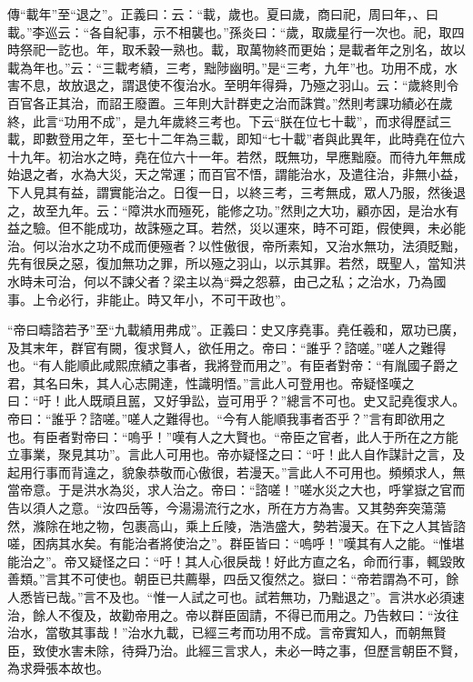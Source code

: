 {\noindent\zhuan{}\fzbyks 傳“載年”至“退之”。正義曰：云：“載，歲也。夏曰歲，商曰祀，周曰年，、曰載。”李巡云：“各自紀事，示不相襲也。”孫炎曰：“歲，取歲星行一次也。祀，取四時祭祀一訖也。年，取禾穀一熟也。載，取萬物終而更始；是載者年之別名，故以載為年也。”云：“三載考績，三考，黜陟幽明。”是“三考，九年”也。功用不成，水害不息，故放退之，謂退使不復治水。至明年得舜，乃殛之羽山。云：“歲終則令百官各正其治，而詔王廢置。三年則大計群吏之治而誅賞。”然則考課功績必在歲終，此言“功用不成”，是九年歲終三考也。下云“朕在位七十載”，而求得歷試三載，即數登用之年，至七十二年為三載，即知“七十載”者與此異年，此時堯在位六十九年。初治水之時，堯在位六十一年。若然，既無功，早應黜廢。而待九年無成始退之者，水為大災，天之常運；而百官不悟，謂能治水，及遣往治，非無小益，下人見其有益，謂實能治之。日復一日，以終三考，三考無成，眾人乃服，然後退之，故至九年。云：“障洪水而殛死，能修之功。”然則之大功，顧亦因，是治水有益之驗。但不能成功，故誅殛之耳。若然，災以運來，時不可距，假使興，未必能治。何以治水之功不成而便殛者？以性傲很，帝所素知，又治水無功，法須貶黜，先有很戾之惡，復加無功之罪，所以殛之羽山，以示其罪。若然，既聖人，當知洪水時未可治，何以不諫父者？梁主以為“舜之怨慕，由己之私；之治水，乃為國事。上令必行，非能止。時又年小，不可干政也”。 \par}

{\noindent\shu{}\fzkt “帝曰疇諮若予”至“九載績用弗成”。正義曰：史又序堯事。堯任羲和，眾功已廣，及其末年，群官有闕，復求賢人，欲任用之。帝曰：“誰乎？諮嗟。”嗟人之難得也。“有人能順此咸熙庶績之事者，我將登而用之”。有臣者對帝：“有胤國子爵之君，其名曰朱，其人心志開達，性識明悟。”言此人可登用也。帝疑怪嘆之曰：“吁！此人既頑且嚚，又好爭訟，豈可用乎？”總言不可也。史又記堯復求人。帝曰：“誰乎？諮嗟。”嗟人之難得也。“今有人能順我事者否乎？”言有即欲用之也。有臣者對帝曰：“嗚乎！”嘆有人之大賢也。“帝臣之官者，此人于所在之方能立事業，聚見其功”。言此人可用也。帝亦疑怪之曰：“吁！此人自作謀計之言，及起用行事而背違之，貌象恭敬而心傲很，若漫天。”言此人不可用也。頻頻求人，無當帝意。于是洪水為災，求人治之。帝曰：“諮嗟！”嗟水災之大也，呼掌嶽之官而告以須人之意。“汝四岳等，今湯湯流行之水，所在方方為害。又其勢奔突蕩蕩然，滌除在地之物，包裹高山，乘上丘陵，浩浩盛大，勢若漫天。在下之人其皆諮嗟，困病其水矣。有能治者將使治之”。群臣皆曰：“嗚呼！”嘆其有人之能。“惟堪能治之”。帝又疑怪之曰：“吁！其人心很戾哉！好此方直之名，命而行事，輒毀敗善類。”言其不可使也。朝臣已共薦舉，四岳又復然之。嶽曰：“帝若謂為不可，餘人悉皆已哉。”言不及也。“惟一人試之可也。試若無功，乃黜退之”。言洪水必須速治，餘人不復及，故勸帝用之。帝以群臣固請，不得已而用之。乃告敕曰：“汝往治水，當敬其事哉！”治水九載，已經三考而功用不成。言帝實知人，而朝無賢臣，致使水害未除，待舜乃治。此經三言求人，未必一時之事，但歷言朝臣不賢，為求舜張本故也。 \par}


